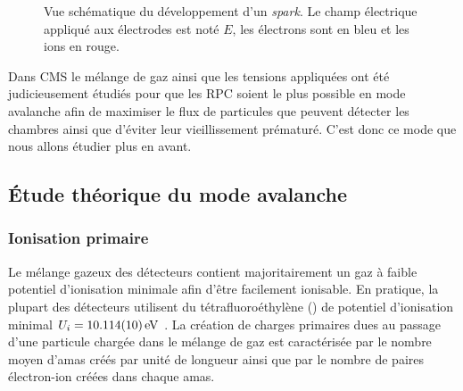 \begin{figure}[ht!]
    \hfill
	\caption{Vue schématique du développement d'un \textit{spark}. Le champ électrique appliqué aux électrodes est noté $E$, les électrons sont en bleu et les ions en rouge.}
	\label{spark}
\end{figure}


Dans CMS le mélange de gaz ainsi que les tensions appliquées ont été judicieusement étudiés pour que les RPC soient le plus possible en mode avalanche afin de maximiser le flux de particules que peuvent détecter les chambres ainsi que d'éviter leur vieillissement prématuré. C'est donc ce mode que nous allons étudier plus en avant.

\subsection{Étude théorique du mode avalanche}

\subsubsection{Ionisation primaire}
Le mélange gazeux des détecteurs contient majoritairement un gaz à faible potentiel d'ionisation minimale afin d'être facilement ionisable. En pratique, la plupart des détecteurs utilisent du tétrafluoroéthylène () de potentiel d'ionisation minimal $U_{i}=\SI{10.114 \pm0.010}{\eV}$ \cite{Chimie:chimie}. La création de charges primaires dues au passage d'une particule chargée dans le mélange de gaz est caractérisée par le nombre moyen d'amas créés par unité de longueur ainsi que par le nombre de paires électron-ion créées dans chaque amas.

